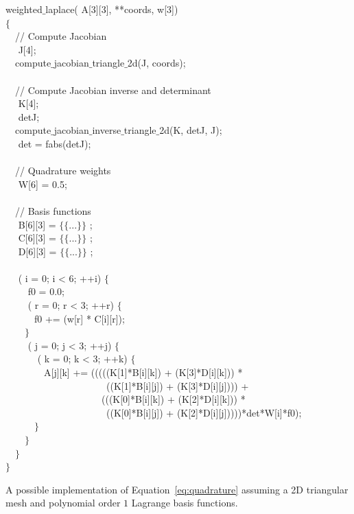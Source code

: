 \begin{algorithm}[h]
\scriptsize\ttfamily
{}

 weighted$\_$laplace( A[3][3],  **coords,  w[3]) \\
$\lbrace$ \\
~~// Compute Jacobian \\
~~ J[4]; \\
~~compute$\_$jacobian$\_$triangle$\_$2d(J, coords); \\
~~\\
~~// Compute Jacobian inverse and determinant \\
~~ K[4]; \\
~~ detJ; \\
~~compute$\_$jacobian$\_$inverse$\_$triangle$\_$2d(K, detJ, J); \\
~~ det = fabs(detJ); \\
~~\\
~~// Quadrature weights \\
~~ W[6] = {0.5}; \\
~~\\
~~// Basis functions \\
~~ B[6][3] = $\lbrace\lbrace$...$\rbrace\rbrace$ ;\\
~~ C[6][3] = $\lbrace\lbrace$...$\rbrace\rbrace$ ;\\
~~ D[6][3] = $\lbrace\lbrace$...$\rbrace\rbrace$ ;\\
~~\\
~~ ( i = 0; i < 6; ++i) $\lbrace$ \\
~~~~ f0  = 0.0;\\
~~~~ ( r  = 0; r < 3; ++r) $\lbrace$ \\
~~~~~~f0 += (w[r] * C[i][r]);\\
~~~~$\rbrace$ \\
~~~~ ( j = 0; j < 3; ++j) $\lbrace$\\
~~~~~~ ( k = 0; k < 3; ++k) $\lbrace$\\
~~~~~~~~A[j][k] += (((((K[1]*B[i][k]) + (K[3]*D[i][k])) * \\
~~~~~~~~~~~~~~~~~~~~~((K[1]*B[i][j]) + (K[3]*D[i][j]))) + \\
~~~~~~~~~~~~~~~~~~~~(((K[0]*B[i][k]) + (K[2]*D[i][k])) * \\
~~~~~~~~~~~~~~~~~~~~~((K[0]*B[i][j]) + (K[2]*D[i][j]))))*det*W[i]*f0);\\
~~~~~~$\rbrace$\\
~~~~$\rbrace$\\
~~$\rbrace$\\
$\rbrace$
\caption{A possible implementation of Equation~\ref{eq:quadrature} assuming a 2D triangular mesh and polynomial order $1$ Lagrange basis functions.}
\label{code:weighted-laplace}
\end{algorithm}



